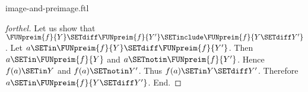 \documentclass{stex}
\begin{document}
\begin{smodule}{image-and-preimage.ftl}
\begin{proof}[forthel]
  Let us show that $\FUNpreim{f}{Y} \SETdiff \FUNpreim{f}{Y'} \SETinclude \FUNpreim{f}{Y \SETdiff Y'}$.
    Let $a \SETin \FUNpreim{f}{Y} \SETdiff \FUNpreim{f}{Y'}$.
    Then $a \SETin \FUNpreim{f}{Y}$ and $a \SETnotin \FUNpreim{f}{Y'}$.
    Hence $f(a) \SETin Y$ and $f(a) \SETnotin Y'$.
    Thus $f(a) \SETin Y \SETdiff Y'$.
    Therefore $a \SETin \FUNpreim{f}{Y \SETdiff Y'}$.
  End.
\end{proof}
\end{smodule}
\end{document}

